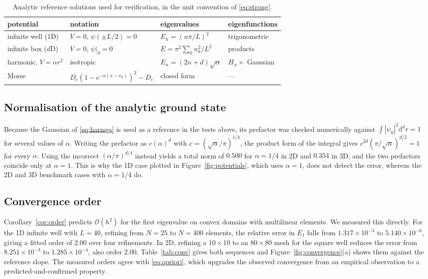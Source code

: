 \documentclass[pdflatex,sn-mathphys-num]{sn-jnl}
\theoremstyle{thmstyleone}%
\theoremstyle{thmstyletwo}%
\theoremstyle{thmstylethree}%
\begin{document}
\begin{table}[t]
\caption{Analytic reference solutions used for verification, in the unit
convention of \eqref{eq:strong}.}\label{tab:analytic}
\begin{tabular}{@{}llll@{}}
\toprule
potential & notation & eigenvalues & eigenfunctions \\
\midrule
infinite well (1D) & $V=0$, $\psi(\pm L/2)=0$ & $E_n = (n\pi/L)^2$ & trigonometric \\
infinite box ($d$D) & $V=0$, $\psi|_{\partial}=0$ & $E = \pi^2\sum_k n_k^2/L^2$ & products \\
harmonic, $V=\alpha r^2$ & isotropic & $E_n = (2n+d)\sqrt{\alpha}$ & $H_n \times$ Gaussian \\
Morse & $D_e(1-e^{-a(x-x_0)})^2 - D_e$ & closed form & --- \\
\bottomrule
\end{tabular}
\end{table}

\subsection{Normalisation of the analytic ground state}\label{sec:normalisation}

Because the Gaussian of \eqref{eq:harmgs} is used as a reference in the tests
above, its prefactor was checked numerically against
$\int|\psi_0|^2\mathrm{d}^d r = 1$ for several values of $\alpha$. Writing the
prefactor as $c(\alpha)^{d}$ with
$c = (\sqrt{\alpha}/\pi)^{1/4}$, the product form of the integral gives
$c^{2d}(\pi/\sqrt{\alpha})^{d/2} = 1$ for every $\alpha$. Using the incorrect
$(\alpha/\pi)^{d/4}$ instead yields a total norm of $0.500$ for $\alpha = 1/4$ in
2D and $0.354$ in 3D, and the two prefactors coincide only at $\alpha = 1$. This
is why the 1D case plotted in Figure~\ref{fig:potentials}, which uses
$\alpha = 1$, does not detect the error, whereas the 2D and 3D benchmark cases
with $\alpha = 1/4$ do.

\subsection{Convergence order}\label{sec:convergence-num}

Corollary~\ref{cor:order} predicts $\mathcal{O}(h^2)$ for the first eigenvalue
on convex domains with multilinear elements. We measured this directly. For the
1D infinite well with $L = 40$, refining from $N = 25$ to $N = 400$ elements,
the relative error in $E_1$ falls from $1.317\times10^{-3}$ to
$5.140\times10^{-6}$, giving a fitted order of $2.00$ over four refinements. In
2D, refining a $10\times10$ to an $80\times80$ mesh for the square well reduces
the error from $8.251\times10^{-3}$ to $1.285\times10^{-4}$, also order $2.00$.
Table~\ref{tab:conv} gives both sequences and Figure~\ref{fig:convergence}(a)
shows them against the reference slope. The measured orders agree with
\eqref{eq:apriori}, which upgrades the observed convergence from an empirical
observation to a predicted-and-confirmed property.
\end{document}
